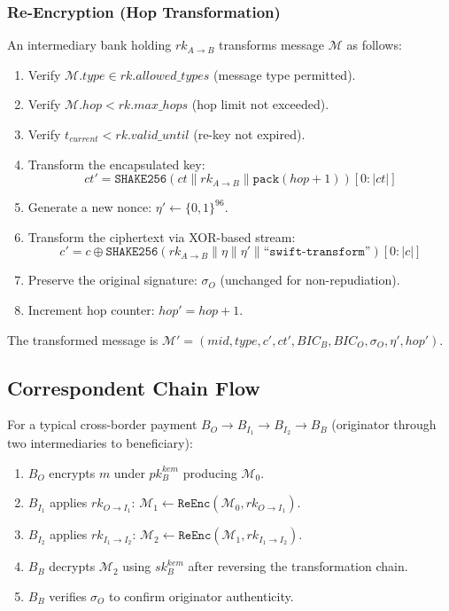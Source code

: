 \documentclass[conference,10pt]{IEEEtran}
\newcommand{\SHAKE}{\texttt{SHAKE256}}
\begin{document}
\subsubsection{Re-Encryption (Hop Transformation)}
An intermediary bank holding $rk_{A \to B}$ transforms message $\mathcal{M}$ as follows:
\begin{enumerate}
\item Verify $\mathcal{M}.type \in rk.allowed\_types$ (message type permitted).
\item Verify $\mathcal{M}.hop < rk.max\_hops$ (hop limit not exceeded).
\item Verify $t_{current} < rk.valid\_until$ (re-key not expired).
\item Transform the encapsulated key:
\begin{equation}
ct' = \SHAKE\!\left(ct \| rk_{A \to B} \| \texttt{pack}(hop + 1)\right)[0{:}|ct|]
\end{equation}
\item Generate a new nonce: $\eta' \leftarrow \{0,1\}^{96}$.
\item Transform the ciphertext via XOR-based stream:
\begin{equation}
c' = c \oplus \SHAKE\!\left(rk_{A \to B} \| \eta \| \eta' \| \texttt{``swift-transform''}\right)[0{:}|c|]
\end{equation}
\item Preserve the original signature: $\sigma_O$ (unchanged for non-repudiation).
\item Increment hop counter: $hop' = hop + 1$.
\end{enumerate}

The transformed message is $\mathcal{M}' = (mid, type, c', ct', BIC_B, BIC_O, \sigma_O, \eta', hop')$.

\subsection{Correspondent Chain Flow}

For a typical cross-border payment $B_O \to B_{I_1} \to B_{I_2} \to B_B$ (originator through two intermediaries to beneficiary):

\begin{enumerate}
\item $B_O$ encrypts $m$ under $pk_B^{kem}$ producing $\mathcal{M}_0$.
\item $B_{I_1}$ applies $rk_{O \to I_1}$: $\mathcal{M}_1 \leftarrow \texttt{ReEnc}(\mathcal{M}_0, rk_{O \to I_1})$.
\item $B_{I_2}$ applies $rk_{I_1 \to I_2}$: $\mathcal{M}_2 \leftarrow \texttt{ReEnc}(\mathcal{M}_1, rk_{I_1 \to I_2})$.
\item $B_B$ decrypts $\mathcal{M}_2$ using $sk_B^{kem}$ after reversing the transformation chain.
\item $B_B$ verifies $\sigma_O$ to confirm originator authenticity.
\end{enumerate}
\end{document}
